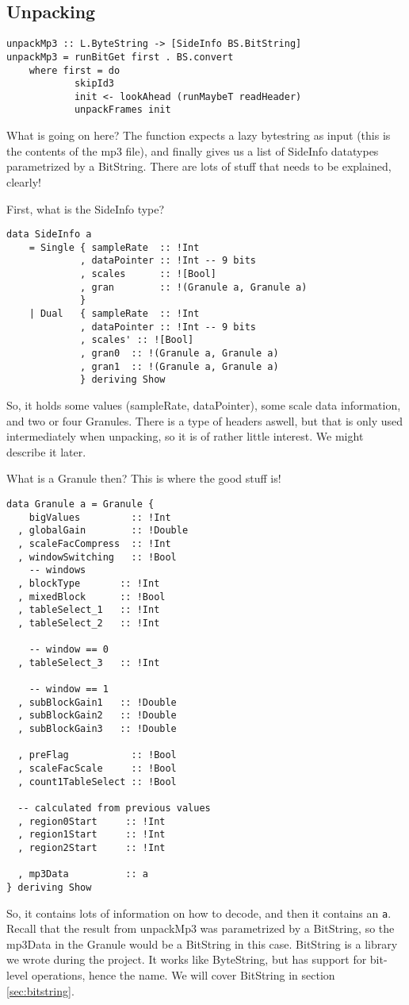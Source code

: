 \documentclass[a4paper,12pt]{article}
\begin{document}
    \subsection{Unpacking}

    \begin{lstlisting}
unpackMp3 :: L.ByteString -> [SideInfo BS.BitString]
unpackMp3 = runBitGet first . BS.convert
    where first = do
            skipId3
            init <- lookAhead (runMaybeT readHeader)
            unpackFrames init
    \end{lstlisting}
    What is going on here? The function expects a lazy bytestring as input (this
    is the contents of the mp3 file), and finally gives us a list of SideInfo
    datatypes parametrized by a BitString. There are lots of stuff that needs to
    be explained, clearly!

    First, what is the SideInfo type?
    \begin{lstlisting}
data SideInfo a
    = Single { sampleRate  :: !Int
             , dataPointer :: !Int -- 9 bits
             , scales      :: ![Bool]
             , gran        :: !(Granule a, Granule a)
             }
    | Dual   { sampleRate  :: !Int
             , dataPointer :: !Int -- 9 bits
             , scales' :: ![Bool]
             , gran0  :: !(Granule a, Granule a)
             , gran1  :: !(Granule a, Granule a)
             } deriving Show
    \end{lstlisting}
    So, it holds some values (sampleRate, dataPointer), some scale data
    information, and two or four Granules. There is a type of headers aswell,
    but that is only used intermediately when unpacking, so it is of rather
    little interest. We might describe it later.

    What is a Granule then? This is where the good stuff is!
    \begin{lstlisting}
data Granule a = Granule {
    bigValues         :: !Int
  , globalGain        :: !Double
  , scaleFacCompress  :: !Int
  , windowSwitching   :: !Bool
    -- windows
  , blockType       :: !Int
  , mixedBlock      :: !Bool
  , tableSelect_1   :: !Int
  , tableSelect_2   :: !Int

    -- window == 0
  , tableSelect_3   :: !Int

    -- window == 1
  , subBlockGain1   :: !Double
  , subBlockGain2   :: !Double
  , subBlockGain3   :: !Double

  , preFlag           :: !Bool
  , scaleFacScale     :: !Bool
  , count1TableSelect :: !Bool

  -- calculated from previous values
  , region0Start     :: !Int
  , region1Start     :: !Int
  , region2Start     :: !Int

  , mp3Data          :: a
} deriving Show
    \end{lstlisting}
    So, it contains lots of information on how to decode, and then it contains
    an \texttt{a}. Recall that the result from unpackMp3 was parametrized by a
    BitString, so the mp3Data in the Granule would be a BitString in this case.
    BitString is a library we wrote during the project. It works like
    ByteString, but has support for bit-level operations, hence the name. We
    will cover BitString in section \ref{sec:bitstring}.
\end{document}
